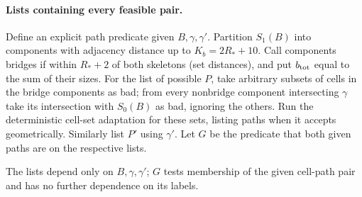 \paragraph{Lists containing every feasible pair.}
Define an explicit path predicate given \(B,\gamma,\gamma'\). Partition \(S_1(B)\) into components with adjacency distance up to \(K_b=2R_*+10\). Call components bridges if within \(R_*+2\) of both skeletons (set distances), and put \(b_{\rm tot}\) equal to the sum of their sizes. For the list of possible \(P\), take arbitrary subsets of cells in the bridge components as bad; from every nonbridge component intersecting \(\gamma\) take its intersection with \(S_0(B)\) as bad, ignoring the others. Run the deterministic cell-set adaptation for these sets, listing paths when it accepts geometrically. Similarly list \(P'\) using \(\gamma'\). Let \(G\) be the predicate that both given paths are on the respective lists.

The lists depend only on $B,\gamma,\gamma'$; $G$ tests membership of
the given cell-path pair and has no further dependence on its labels.


